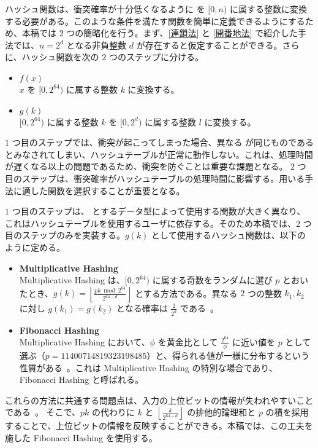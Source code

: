 \documentclass[dvipdfmx,a4j,10pt]{jarticle}
\begin{document}
ハッシュ関数は、衝突確率が十分低くなるように  を $[0, n)$ に属する整数に変換する必要がある。このような条件を満たす関数を簡単に定義できるようにするため、本稿では $2$ つの簡略化を行う。まず、\ref{連鎖法} と \ref{開番地法} で紹介した手法では、$n = 2^d$ となる非負整数 $d$ が存在すると仮定することができる。さらに、ハッシュ関数を次の $2$ つのステップに分ける。

\begin{itemize}
  \item $f(x)$ \mbox{}\\  $x$ を $[0, 2^{64})$ に属する整数 $k$ に変換する。
  \item $g(k)$ \mbox{}\\ $[0, 2^{64})$ に属する整数 $k$ を $[0, 2^d)$ に属する整数 $l$ に変換する。
\end{itemize}

$1$ つ目のステップでは、衝突が起こってしまった場合、異なる  が同じものであるとみなされてしまい、ハッシュテーブルが正常に動作しない。これは、処理時間が遅くなる以上の問題であるため、衝突を防ぐことは重要な課題となる。
$2$ つ目のステップは、衝突確率がハッシュテーブルの処理時間に影響する。用いる手法に適した関数を選択することが重要となる。

$1$ つ目のステップは、 とするデータ型によって使用する関数が大きく異なり、これはハッシュテーブルを使用するユーザに依存する。そのため本稿では、$2$ つ目のステップのみを実装する。$g(k)$ として使用するハッシュ関数は、以下のように定める。

\begin{itemize}
  \item \textbf{Multiplicative Hashing} \mbox{}\\ Multiplicative Hashing は、$[0, 2^{64})$ に属する奇数をランダムに選び $p$ とおいたとき、$\displaystyle g(k) = \left\lfloor \frac{pk \bmod 2^{64}}{2^{64-d}} \right\rfloor$ とする方法である。異なる $2$ つの整数 $k_1, k_2$ に対し $g(k_1) = g(k_2)$ となる確率は $\displaystyle \frac{2}{2^d}$ である~\cite{データ構造}。
  \item \textbf{Fibonacci Hashing} \mbox{}\\ Multiplicative Hashing において、$\phi$ を黄金比として $\displaystyle \frac{2^{64}}{\phi}$ に近い値を $p$ として選ぶ（$p = 11400714819323198485$）と、得られる値が一様に分布するという性質がある~\cite{FibHash}。これは Multiplicative Hashing の特別な場合であり、Fibonacci Hashing と呼ばれる。
\end{itemize}

これらの方法に共通する問題点は、入力の上位ビットの情報が失われやすいことである~\cite{FibHash}。
そこで、$pk$ の代わりに $k$ と $\displaystyle \left\lfloor \frac{k}{2^{64-d}} \right\rfloor$ の排他的論理和と $p$ の積を採用することで、上位ビットの情報を反映することができる。本稿では、この工夫を施した Fibonacci Hashing を使用する。
\end{document}
